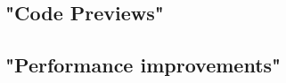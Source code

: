 	\subsection{"Code Previews"}

	\subsection{"Performance improvements"}
	\label{sec:PerformanceEvaluation}
	
	
	
